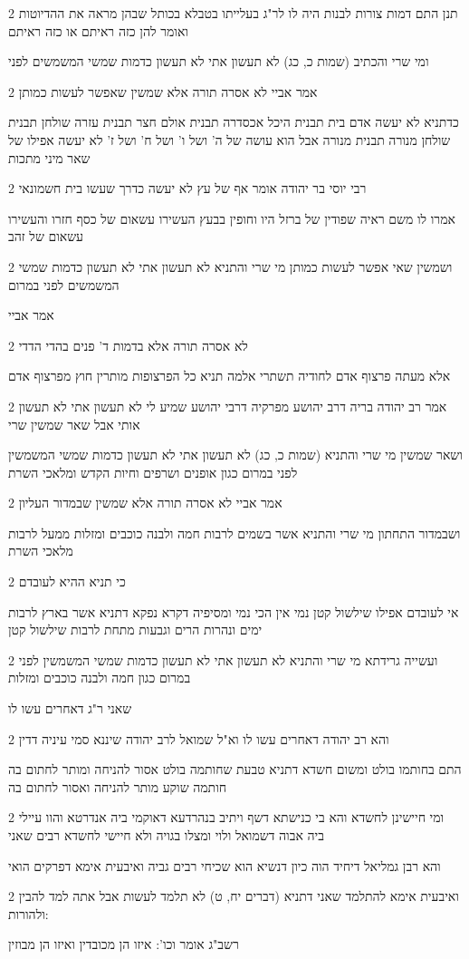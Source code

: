 \documentclass[12pt, openany]{book}
\newcommand{\sethebfont}{
\fontsize{10.5pt}{21.0pt} \selectfont
}
\newcommand{\twocol}[1]{
	{\sethebfont \begin{multicols}{2}
			#1
	\end{multicols}}	
}
\begin{document}
\twocol{תנן התם דמות צורות לבנות היה לו לר"ג בעלייתו בטבלא בכותל שבהן מראה את ההדיוטות ואומר להן כזה ראיתם או כזה ראיתם
\par ומי שרי והכתיב (שמות כ, כג) לא תעשון אתי לא תעשון כדמות שמשי המשמשים לפני}
\twocol{אמר אביי לא אסרה תורה אלא שמשין שאפשר לעשות כמותן
\par כדתניא לא יעשה אדם בית תבנית היכל אכסדרה תבנית אולם חצר תבנית עזרה שולחן תבנית שולחן מנורה תבנית מנורה אבל הוא עושה של ה' ושל ו' ושל ח' ושל ז' לא יעשה אפילו של שאר מיני מתכות}
\twocol{רבי יוסי בר יהודה אומר אף של עץ לא יעשה כדרך שעשו בית חשמונאי
\par אמרו לו משם ראיה שפודין של ברזל היו וחופין בבעץ העשירו עשאום של כסף חזרו והעשירו עשאום של זהב}
\twocol{ושמשין שאי אפשר לעשות כמותן מי שרי והתניא לא תעשון אתי לא תעשון כדמות שמשי המשמשים לפני במרום
\par אמר אביי}
\twocol{לא אסרה תורה אלא בדמות ד' פנים בהדי הדדי
\par אלא מעתה פרצוף אדם לחודיה תשתרי אלמה תניא כל הפרצופות מותרין חוץ מפרצוף אדם}
\twocol{אמר רב יהודה בריה דרב יהושע מפרקיה דרבי יהושע שמיע לי לא תעשון אתי לא תעשון אותי אבל שאר שמשין שרי
\par ושאר שמשין מי שרי והתניא (שמות כ, כג) לא תעשון אתי לא תעשון כדמות שמשי המשמשין לפני במרום כגון אופנים ושרפים וחיות הקדש ומלאכי השרת}
\twocol{אמר אביי לא אסרה תורה אלא שמשין שבמדור העליון
\par ושבמדור התחתון מי שרי והתניא אשר בשמים לרבות חמה ולבנה כוכבים ומזלות ממעל לרבות מלאכי השרת}
\twocol{כי תניא ההיא לעובדם
\par אי לעובדם אפילו שילשול קטן נמי אין הכי נמי ומסיפיה דקרא נפקא דתניא אשר בארץ לרבות ימים ונהרות הרים וגבעות מתחת לרבות שילשול קטן}
\twocol{ועשייה גרידתא מי שרי והתניא לא תעשון אתי לא תעשון כדמות שמשי המשמשין לפני במרום כגון חמה ולבנה כוכבים ומזלות
\par שאני ר"ג דאחרים עשו לו}
\twocol{והא רב יהודה דאחרים עשו לו וא"ל שמואל לרב יהודה שיננא סמי עיניה דדין
\par התם בחותמו בולט ומשום חשדא דתניא טבעת שחותמה בולט אסור להניחה ומותר לחתום בה חותמה שוקע מותר להניחה ואסור לחתום בה}
\twocol{ומי חיישינן לחשדא והא בי כנישתא דשף ויתיב בנהרדעא דאוקמי ביה אנדרטא והוו עיילי ביה אבוה דשמואל ולוי ומצלו בגויה ולא חיישי לחשדא רבים שאני
\par והא רבן גמליאל דיחיד הוה כיון דנשיא הוא שכיחי רבים גביה ואיבעית אימא דפרקים הואי}
\twocol{ואיבעית אימא להתלמד שאני דתניא (דברים יח, ט) לא תלמד לעשות אבל אתה למד להבין ולהורות:
\par רשב"ג אומר וכו': איזו הן מכובדין ואיזו הן מבוזין}
\end{document}
